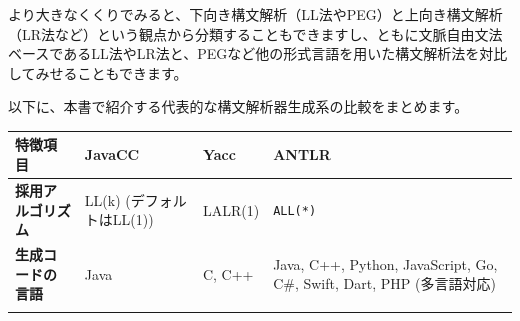 より大きなくくりでみると、下向き構文解析（LL法やPEG）と上向き構文解析（LR法など）という観点から分類することもできますし、ともに文脈自由文法ベースであるLL法やLR法と、PEGなど他の形式言語を用いた構文解析法を対比してみせることもできます。

以下に、本書で紹介する代表的な構文解析器生成系の比較をまとめます。

\begin{longtable}[]{@{}llll@{}}
\toprule
\begin{minipage}[b]{0.14\columnwidth}\raggedright
特徴項目\strut
\end{minipage} & \begin{minipage}[b]{0.20\columnwidth}\raggedright
JavaCC\strut
\end{minipage} & \begin{minipage}[b]{0.22\columnwidth}\raggedright
Yacc\strut
\end{minipage} & \begin{minipage}[b]{0.32\columnwidth}\raggedright
ANTLR\strut
\end{minipage}\tabularnewline
\midrule
\endhead
\begin{minipage}[t]{0.14\columnwidth}\raggedright
\textbf{採用アルゴリズム}\strut
\end{minipage} & \begin{minipage}[t]{0.20\columnwidth}\raggedright
LL(k) (デフォルトはLL(1))\strut
\end{minipage} & \begin{minipage}[t]{0.22\columnwidth}\raggedright
LALR(1)\strut
\end{minipage} & \begin{minipage}[t]{0.32\columnwidth}\raggedright
\texttt{ALL(*)}\strut
\end{minipage}\tabularnewline
\begin{minipage}[t]{0.14\columnwidth}\raggedright
\textbf{生成コードの言語}\strut
\end{minipage} & \begin{minipage}[t]{0.20\columnwidth}\raggedright
Java\strut
\end{minipage} & \begin{minipage}[t]{0.22\columnwidth}\raggedright
C, C++\strut
\end{minipage} & \begin{minipage}[t]{0.32\columnwidth}\raggedright
Java, C++, Python, JavaScript, Go, C\#, Swift, Dart, PHP
(多言語対応)\strut
\end{minipage}\tabularnewline
\begin{minipage}[t]{0.14\columnwidth}\raggedright

\end{minipage}
\end{longtable}
